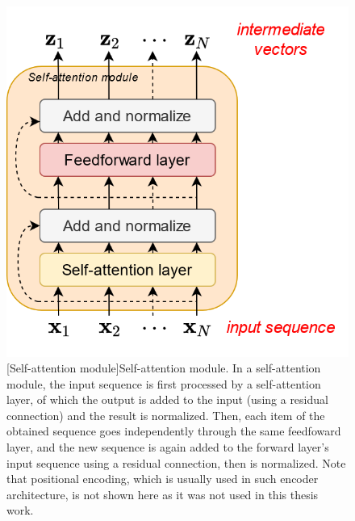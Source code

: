 \begin{figure}[t]
    \begin{center}
    \includegraphics[width=0.6\linewidth]{Images/chap3/selfAttentionModule.png}
    [Self-attention module]{Self-attention module. In a self-attention module, the input sequence is first processed by a self-attention layer, of which the output is added to the input (using a residual connection) and the result is normalized. Then, each item of the obtained sequence goes independently through the same feedfoward layer, and the new sequence is again added to the forward layer's input sequence using a residual connection, then is normalized. Note that positional encoding, which is usually used in such encoder architecture, is not shown here as it was not used in this thesis work.}
    \label{fig:selfAttentionModule}
    \end{center}
\end{figure}

